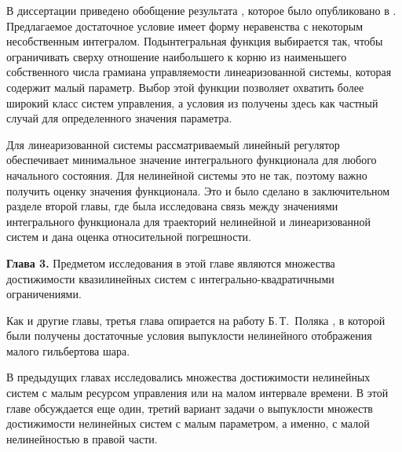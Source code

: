 \documentclass[../main.tex]{subfiles}
\begin{document}
В диссертации приведено обобщение результата \cite{GusevOsipov}, которое было опубликовано в \cite{GusevOsipovMotor}. 
Предлагаемое достаточное условие имеет форму неравенства с некоторым несобственным интегралом.
Подынтегральная функция выбирается так, чтобы ограничивать сверху отношение наибольшего к корню из наименьшего собственного числа грамиана управляемости линеаризованной системы, которая содержит малый параметр. 
Выбор этой функции позволяет охватить более широкий класс систем управления, а условия из \cite{GusevOsipov} получены здесь как частный случай для определенного значения параметра.

Для линеаризованной системы рассматриваемый линейный регулятор обеспечивает минимальное значение интегрального функционала для любого начального состояния. 
Для нелинейной системы это не так, поэтому важно получить оценку значения функционала. 
Это и было сделано в заключительном разделе второй главы, где была исследована связь между значениями интегрального функционала для траекторий нелинейной и линеаризованной систем и дана оценка относительной погрешности. 

\textbf{Глава 3. }
Предметом исследования в этой главе являются множества достижимости квазилинейных систем с интегрально-квадратичными ограничениями.

Как и другие главы, третья глава опирается на работу Б.\,Т.~Поляка \cite{Polyak2001}, в которой были получены достаточные условия выпуклости нелинейного отображения малого гильбертова шара.

В предыдущих главах исследовались множества достижимости нелинейных систем с малым ресурсом управления или на малом интервале времени.
В этой главе обсуждается еще один, третий вариант задачи о выпуклости множеств достижимости нелинейных систем с малым параметром, а именно, с малой нелинейностью в правой части. 
\end{document}

